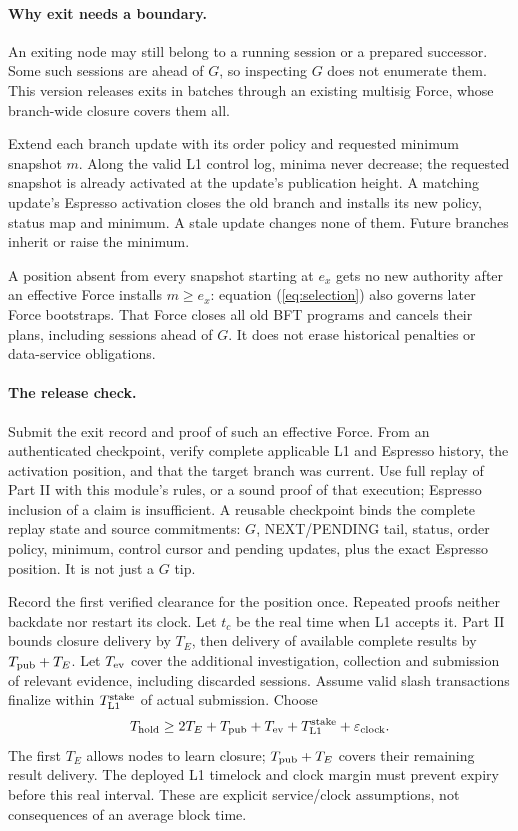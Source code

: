 \documentclass[11pt,a4paper]{article}
\begin{document}
\paragraph{Why exit needs a boundary.}
An exiting node may still belong to a running session or a prepared
successor. Some such sessions are ahead of $G$, so inspecting $G$ does
not enumerate them. This version releases exits in batches through an
existing multisig Force, whose branch-wide closure covers them all.

Extend each branch update with its order policy and requested minimum
snapshot $m$. Along the valid L1 control log, minima never decrease; the
requested snapshot is already activated at the update's publication
height. A matching update's Espresso activation closes the old branch
and installs its new policy, status map and minimum. A stale update
changes none of them. Future branches inherit or raise the minimum.

A position absent from every snapshot starting at $e_x$ gets no new
authority after an effective Force installs $m\ge e_x$: equation
(\ref{eq:selection}) also governs later Force bootstraps. That Force closes
all old BFT programs and cancels their plans, including sessions ahead of
$G$. It does not erase historical penalties or data-service obligations.

\paragraph{The release check.}
Submit the exit record and proof of such an effective Force. From an
authenticated checkpoint, verify complete applicable L1 and Espresso
history, the activation position, and that the target branch was current.
Use full replay of Part II with this module's rules, or a sound proof of
that execution; Espresso inclusion of a claim is insufficient. A reusable
checkpoint binds the complete replay state and source commitments:
$G$, NEXT/PENDING tail, status, order policy, minimum, control cursor and
pending updates, plus the exact Espresso position. It is not just a $G$ tip.

Record the first verified clearance for the position once. Repeated
proofs neither backdate nor restart its clock. Let $t_c$ be the real time
when L1 accepts it. Part II bounds closure delivery by $T_E$, then delivery
of available complete results by $T_{\rm pub}+T_E$. Let $T_{\rm ev}$ cover
the additional investigation, collection and submission of relevant
evidence, including discarded sessions. Assume valid slash transactions
finalize within $T_{\rm L1}^{\rm stake}$ of actual submission. Choose
\[
 T_{\rm hold}\ge 2T_E+T_{\rm pub}+T_{\rm ev}
                    +T_{\rm L1}^{\rm stake}+\varepsilon_{\rm clock}.
\]
The first $T_E$ allows nodes to learn closure; $T_{\rm pub}+T_E$ covers
their remaining result delivery. The deployed L1 timelock and clock
margin must prevent expiry before this real interval. These are explicit
service/clock assumptions, not consequences of an average block time.
\end{document}
